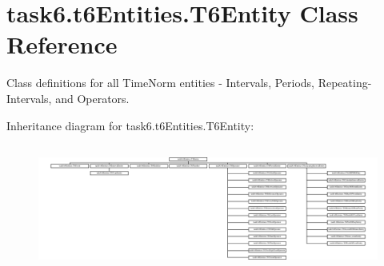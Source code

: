\hypertarget{classtask6_1_1t6Entities_1_1T6Entity}{}\section{task6.\+t6\+Entities.\+T6\+Entity Class Reference}
\label{classtask6_1_1t6Entities_1_1T6Entity}


Class definitions for all Time\+Norm entities -\/ Intervals, Periods, Repeating-\/\+Intervals, and Operators.  


Inheritance diagram for task6.\+t6\+Entities.\+T6\+Entity\+:\begin{figure}[H]
\begin{center}
\leavevmode
\includegraphics[height=4.233871cm]{classtask6_1_1t6Entities_1_1T6Entity}
\end{center}
\end{figure}
